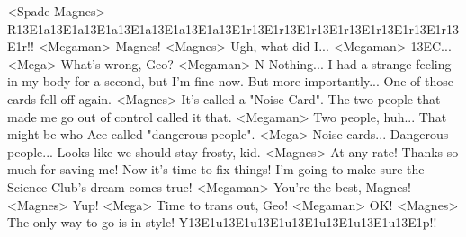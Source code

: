 <Spade-Magnes> R{13}{E1}a{13}{E1}a{13}{E1}a{13}{E1}a{13}{E1}a{13}{E1}a{13}{E1}r{13}{E1}r{13}{E1}r{13}{E1}r{13}{E1}r{13}{E1}r{13}{E1}r{13}{E1}r!! 
<Megaman> Magnes! 
<Magnes> Ugh, what did I... 
<Megaman> {13}{EC}... 
<Mega> What's wrong, Geo? 
<Megaman> N-Nothing... I had a strange feeling in my body for a second, but I'm fine now. 
But more importantly... One of those cards fell off again. 
<Magnes> It's called a "Noise Card". 
The two people that made me go out of control called it that. 
<Megaman> Two people, huh... That might be who Ace called "dangerous people". 
<Mega> Noise cards... Dangerous people... 
Looks like we should stay frosty, kid. 
<Magnes> At any rate! Thanks so much for saving me! 
Now it's time to fix things! 
I'm going to make sure the Science Club's dream comes true! 
<Megaman> You're the best, Magnes! 
<Magnes> Yup! 
<Mega> Time to trans out, Geo! 
<Megaman> OK! 
<Magnes> The only way to go is in style! 
Y{13}{E1}u{13}{E1}u{13}{E1}u{13}{E1}u{13}{E1}u{13}{E1}u{13}{E1}p!! 
